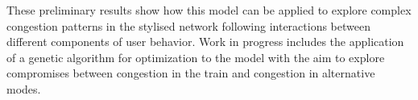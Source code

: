 \documentclass[3p,times,procedia]{elsarticle}
\begin{document}
These preliminary results show how this model can be applied to explore complex congestion patterns in the stylised network following interactions between different components of user behavior. Work in progress includes the application of a genetic algorithm for optimization to the model with the aim to explore compromises between congestion in the train and congestion in alternative modes.






%

\vspace{-0.5cm}




\clearpage
\end{document}
